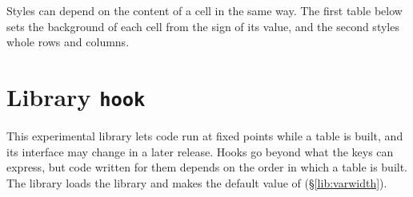 Styles can depend on the content of a cell in the same way. The first table below sets the background of each cell from the sign of its value, and the second styles whole rows and columns.

\begin{center}
\end{center}

\section{Library \texttt{hook}}\label{lib:hook}
This experimental library lets code run at fixed points while a table is built, and its interface may change in a later release. Hooks go beyond what the keys can express, but code written for them depends on the order in which a table is built. The library loads the  library and makes  the default value of  (\S\ref{lib:varwidth}).

